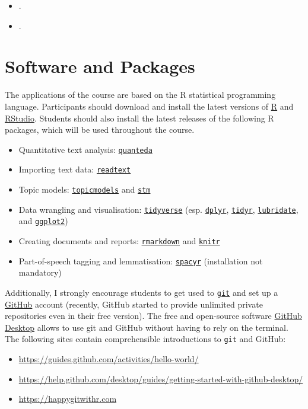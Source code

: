 \documentclass[abstract=on,parskip=full,headings=standardclasses,fontsize=11pt,paper=a4]{scrartcl}
\begin{document}
\begin{itemize}
\item {}.
\item {}.
\end{itemize}

\section*{Software and Packages}

The applications of the course are based on the \textsf{R} statistical programming language. Participants should download and install the latest versions of \textsf{\href{https://www.r-project.org}{R}} and \href{https://www.rstudio.com/products/rstudio/}{RStudio}. Students should also install the latest releases of the following  \textsf{R} packages, which will be used throughout the course.

\begin{itemize}
\item Quantitative text analysis: \href{https://quanteda.io/}{\texttt{quanteda}}
\item Importing text data: \href{https://readtext.quanteda.io/}{\texttt{readtext}}
\item Topic models: \href{https://cran.r-project.org/web/packages/topicmodels/index.html}{\texttt{topicmodels}}  and \href{https://www.structuraltopicmodel.com/}{\texttt{stm}}
\item Data wrangling and visualisation: \href{https://www.tidyverse.org}{\texttt{tidyverse}} (esp. \href{https://dplyr.tidyverse.org}{\texttt{dplyr}}, \href{https://tidyr.tidyverse.org}{\texttt{tidyr}}, \href{https://lubridate.tidyverse.org}{\texttt{lubridate}}, and \href{https://ggplot2.tidyverse.org}{\texttt{ggplot2}})
\item Creating documents and reports: \href{https://rmarkdown.rstudio.com}{\texttt{rmarkdown}} and \href{https://yihui.name/knitr/}{\texttt{knitr}}
\item Part-of-speech tagging and lemmatisation: \href{https://spacyr.quanteda.io}{\texttt{spacyr}} (installation not mandatory)
\end{itemize}

Additionally, I strongly encourage students to get used to \href{https://git-scm.com}{\texttt{git}}  and set up a \href{https://github.com}{GitHub} account (recently, GitHub started to provide unlimited private repositories even in their free version). The free  and open-source software \href{https://desktop.github.com}{GitHub Desktop} allows to use git and GitHub without having to rely on the terminal. The following sites contain comprehensible introductions to \texttt{git} and GitHub:
\begin{itemize}
\item \url{https://guides.github.com/activities/hello-world/}
\item \url{https://help.github.com/desktop/guides/getting-started-with-github-desktop/}
\item \url{https://happygitwithr.com}
\end{itemize}
\end{document}
